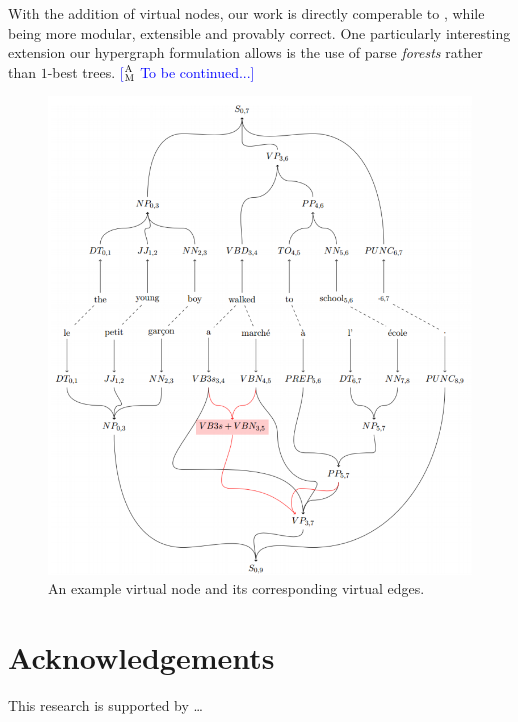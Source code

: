 \documentclass[nofonts]{pbml} %
\newcommand{\ensuretext}[1]{#1}
\newcommand{\mycomment}[3]{\ensuretext{\textcolor{#3}{[#1 #2]}}}
\newcommand{\ammarker}{\ensuretext{\textcolor{blue}{\ensuremath{^{\textsc{A}}_{\textsc{M}}}}}}
\newcommand{\am}[1]{\mycomment{\ammarker}{#1}{blue}}
\begin{document}
With the addition of virtual nodes, our work is directly comperable to \citet{hanneman2011general}, while being more modular, extensible and provably correct.
One particularly interesting extension our hypergraph formulation allows is the use of parse \emph{forests} rather than $1$-best trees.
\am{To be continued...}




\begin{figure}[ht!]
\centering
\includegraphics[scale=0.25]{virtualnode.png}
\caption{An example virtual node and its corresponding virtual edges.}
\label{virtualnodefig}
\end{figure}

\section*{Acknowledgements}
This research is supported by \ldots



\correspondingaddress
\end{document}
